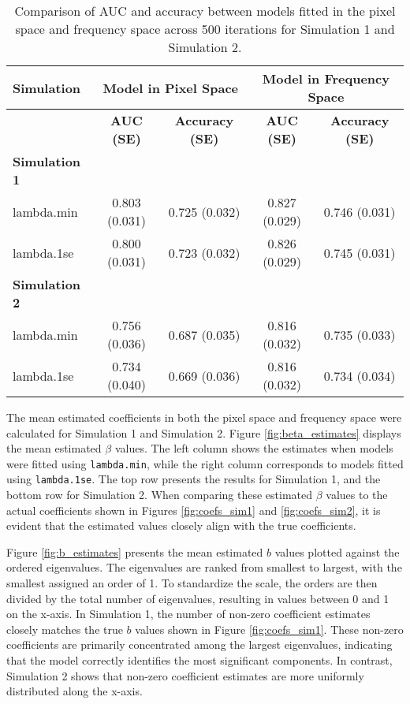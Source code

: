 \documentclass[12pt]{article}
\begin{document}
\begin{table}[htbp]
\centering
\caption{Comparison of AUC and accuracy between models fitted in the pixel space and frequency space across 500 iterations for Simulation 1 and Simulation 2.}
\label{tab:auc_acc_table}
\begin{tabular}{l|cc|cc}
\toprule
\textbf{Simulation} & \multicolumn{2}{c}{\textbf{Model in Pixel Space}} & \multicolumn{2}{c}{\textbf{Model in Frequency Space}} \\ 
\midrule
& \textbf{AUC (SE)} & \textbf{Accuracy (SE)} & \textbf{AUC (SE)} & \textbf{Accuracy (SE)} \\ 
\midrule
\textbf{Simulation 1} & & & & \\
lambda.min & 0.803 (0.031) & 0.725 (0.032) & 0.827 (0.029) & 0.746 (0.031) \\
lambda.1se & 0.800 (0.031) & 0.723 (0.032) & 0.826 (0.029) & 0.745 (0.031) \\ 
\midrule
\textbf{Simulation 2} & & & & \\
lambda.min & 0.756 (0.036) & 0.687 (0.035) & 0.816 (0.032) & 0.735 (0.033)  \\
lambda.1se & 0.734 (0.040) & 0.669 (0.036) & 0.816 (0.032) & 0.734 (0.034) \\
\bottomrule
\end{tabular}
\end{table}

The mean estimated coefficients in both the pixel space and frequency space were calculated for Simulation 1 and
Simulation 2. Figure \ref{fig:beta_estimates} displays the mean estimated \( \beta \) values. The left column shows the
estimates when models were fitted using \texttt{lambda.min}, while the right column corresponds to models fitted using
\texttt{lambda.1se}. The top row presents the results for Simulation 1, and the bottom row for Simulation 2. When
comparing these estimated \( \beta \) values to the actual coefficients shown in Figures \ref{fig:coefs_sim1} and
\ref{fig:coefs_sim2}, it is evident that the estimated values closely align with the true coefficients.

Figure \ref{fig:b_estimates} presents the mean estimated \( b \) values plotted against the ordered eigenvalues. The
eigenvalues are ranked from smallest to largest, with the smallest assigned an order of 1. To standardize the scale, the
orders are then divided by the total number of eigenvalues, resulting in values between 0 and 1 on the x-axis. In
Simulation 1, the number of non-zero coefficient estimates closely matches the true \( b \) values shown in Figure
\ref{fig:coefs_sim1}. These non-zero coefficients are primarily concentrated among the largest eigenvalues, indicating
that the model correctly identifies the most significant components. In contrast, Simulation 2 shows that non-zero
coefficient estimates are more uniformly distributed along the x-axis.
\end{document}

